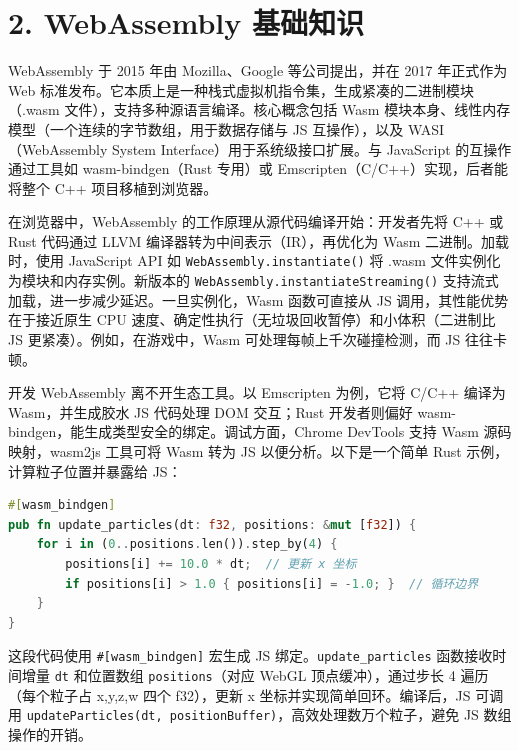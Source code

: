 \chapter{2. WebAssembly 基础知识}
WebAssembly 于 2015 年由 Mozilla、Google 等公司提出，并在 2017 年正式作为 Web 标准发布。它本质上是一种栈式虚拟机指令集，生成紧凑的二进制模块（.wasm 文件），支持多种源语言编译。核心概念包括 Wasm 模块本身、线性内存模型（一个连续的字节数组，用于数据存储与 JS 互操作），以及 WASI（WebAssembly System Interface）用于系统级接口扩展。与 JavaScript 的互操作通过工具如 wasm-bindgen（Rust 专用）或 Emscripten（C/C++）实现，后者能将整个 C++ 项目移植到浏览器。\par
在浏览器中，WebAssembly 的工作原理从源代码编译开始：开发者先将 C++ 或 Rust 代码通过 LLVM 编译器转为中间表示（IR），再优化为 Wasm 二进制。加载时，使用 JavaScript API 如 \texttt{WebAssembly.instantiate()} 将 .wasm 文件实例化为模块和内存实例。新版本的 \texttt{WebAssembly.instantiateStreaming()} 支持流式加载，进一步减少延迟。一旦实例化，Wasm 函数可直接从 JS 调用，其性能优势在于接近原生 CPU 速度、确定性执行（无垃圾回收暂停）和小体积（二进制比 JS 更紧凑）。例如，在游戏中，Wasm 可处理每帧上千次碰撞检测，而 JS 往往卡顿。\par
开发 WebAssembly 离不开生态工具。以 Emscripten 为例，它将 C/C++ 编译为 Wasm，并生成胶水 JS 代码处理 DOM 交互；Rust 开发者则偏好 wasm-bindgen，能生成类型安全的绑定。调试方面，Chrome DevTools 支持 Wasm 源码映射，wasm2js 工具可将 Wasm 转为 JS 以便分析。以下是一个简单 Rust 示例，计算粒子位置并暴露给 JS：\par
\begin{lstlisting}[language=rust]
#[wasm_bindgen]
pub fn update_particles(dt: f32, positions: &mut [f32]) {
    for i in (0..positions.len()).step_by(4) {
        positions[i] += 10.0 * dt;  // 更新 x 坐标
        if positions[i] > 1.0 { positions[i] = -1.0; }  // 循环边界
    }
}
\end{lstlisting}
这段代码使用 \texttt{\#{}[wasm\_{}bindgen]} 宏生成 JS 绑定。\texttt{update\_{}particles} 函数接收时间增量 \texttt{dt} 和位置数组 \texttt{positions}（对应 WebGL 顶点缓冲），通过步长 4 遍历（每个粒子占 x,y,z,w 四个 f32），更新 x 坐标并实现简单回环。编译后，JS 可调用 \texttt{updateParticles(dt, positionBuffer)}，高效处理数万个粒子，避免 JS 数组操作的开销。\par
